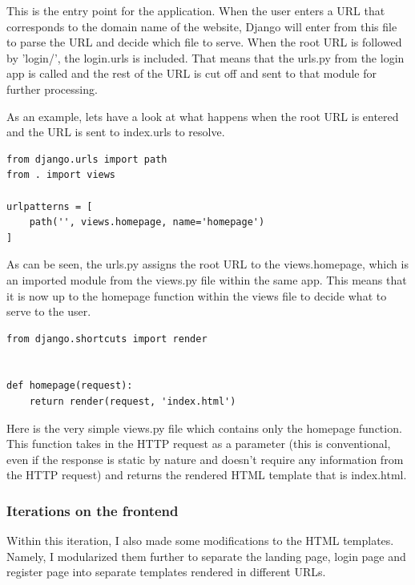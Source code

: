 \documentclass{article}
\begin{document}
This is the entry point for the application. When the user enters a URL that corresponds to the domain name of the website, Django will enter from this file to parse the URL and decide which file to serve. When the root URL is followed by 'login/', the login.urls is included. That means that the urls.py from the login app is called and the rest of the URL is cut off and sent to that module for further processing. 

As an example, lets have a look at what happens when the root URL is entered and the URL is sent to index.urls to resolve.

\begin{lstlisting}[caption={index/urls.py}]
from django.urls import path
from . import views

urlpatterns = [
    path('', views.homepage, name='homepage')
]
\end{lstlisting}

As can be seen, the urls.py assigns the root URL to the views.homepage, which is an imported module from the views.py file within the same app. This means that it is now up to the homepage function within the views file to decide what to serve to the user. 

\begin{lstlisting}[caption={index/views.py}]
from django.shortcuts import render


def homepage(request):
    return render(request, 'index.html')
\end{lstlisting}

Here is the very simple views.py file which contains only the homepage function. This function takes in the HTTP request as a parameter (this is conventional, even if the response is static by nature and doesn't require any information from the HTTP request) and returns the rendered HTML template that is index.html. 

\subsubsection{Iterations on the frontend}

Within this iteration, I also made some modifications to the HTML templates. Namely, I modularized them further to separate the landing page, login page and register page into separate templates rendered in different URLs. 
\end{document}
